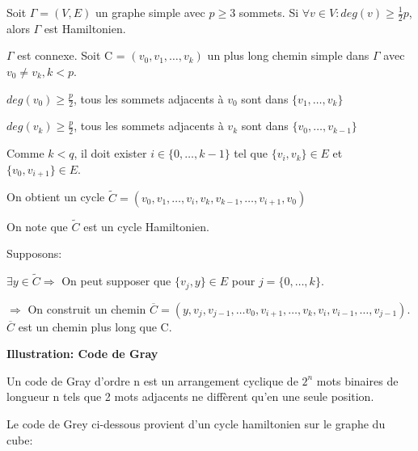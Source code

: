 


\newpage

\begin{thrm}[Dirac 1950]
Soit $\Gamma = (V,E)$ un graphe simple avec $p \geq 3$ sommets. Si $\forall v \in V: deg(v) \geq \frac{1}{2}p$, alors $\Gamma$ est Hamiltonien.
\end{thrm}

\begin{demo}
$\Gamma$ est connexe. Soit C = $(v_{0},v_{1},\ldots,v_{k})$ un plus long chemin simple dans $\Gamma$ avec $v_{0} \neq v_{k}, k < p$.

$ deg(v_{0}) \geq \frac{p}{2}$, tous les sommets adjacents à $v_{0}$ sont dans $\{v_{1},\ldots,v_{k}\}$

$ deg(v_{k}) \geq \frac{p}{2}$, tous les sommets adjacents à $v_{k}$ sont dans $\{v_{0},\ldots,v_{k-1}\}$

Comme $k < q$, il doit exister $i \in \{0,\ldots,k-1\}$ tel que $\{v_{i},v_{k}\} \in E$ et $\{v_{0},v_{i+1}\} \in E$. 

On obtient un cycle $\widetilde{C} = (v_{0},v_{1},\ldots,v_{i},v_{k},v_{k-1},\ldots,v_{i+1},v_{0})$ 



On note que $\widetilde{C}$ est un cycle Hamiltonien.

Supposons:

$\exists  y \in \widetilde{C} \Rightarrow$ On peut supposer que $\{ v_{j},y\} \in E$ pour $j=\{0,\ldots,k\}$.

$\Rightarrow$ On construit un chemin $\overline{C} = (y, v_{j},v_{j-1},\ldots v_{0},v_{i+1},\ldots,v_{k},v_{i},v_{i-1},\ldots,v_{j-1})$. $\overline{C}$ est un chemin plus long que C. 



\end{demo}

\newpage

\textbf{Illustration: Code de Gray}

Un code de Gray d'ordre n est un arrangement cyclique de $2^{n}$ mots binaires de longueur n tels que 2 mots adjacents ne diffèrent qu'en une seule position.

\begin{exmp}
Le code de Grey ci-dessous provient d'un cycle hamiltonien sur le graphe du cube:
\end{exmp}

